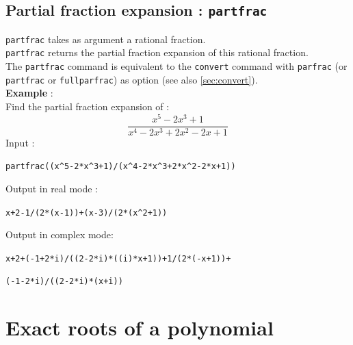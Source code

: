 \documentclass[a4paper,11pt]{book}
\begin{document}
\subsection{Partial fraction expansion  : {\tt partfrac}}\label{sec:convertparf}
{\tt partfrac} takes as argument a rational fraction.\\
{\tt partfrac} returns the partial fraction expansion of this rational 
fraction.\\
The {\tt partfrac} command is equivalent to the {\tt convert} command with 
{\tt parfrac} (or {\tt partfrac} or {\tt fullparfrac}) as option 
(see also \ref{sec:convert}).\\
{\bf Example} :\\
Find the partial fraction expansion of :
$$\frac{x^5-2x^3+1}{x^4-2x^3+2x^2-2x+1}$$
Input :
\begin{center}{\tt partfrac((x\verb|^|5-2*x\verb|^|3+1)/(x\verb|^|4-2*x\verb|^|3+2*x\verb|^|2-2*x+1))}\end{center}
Output in real mode :
\begin{center}{\tt x+2-1/(2*(x-1))+(x-3)/(2*(x\verb|^|2+1)) }\end{center}
Output in complex mode:
\begin{center}{\tt x+2+(-1+2*i)/((2-2*i)*((i)*x+1))+1/(2*(-x+1))+}\end{center}
\begin{center}{\tt (-1-2*i)/((2-2*i)*(x+i))}\end{center}

\section{Exact roots of a polynomial}
\end{document}
